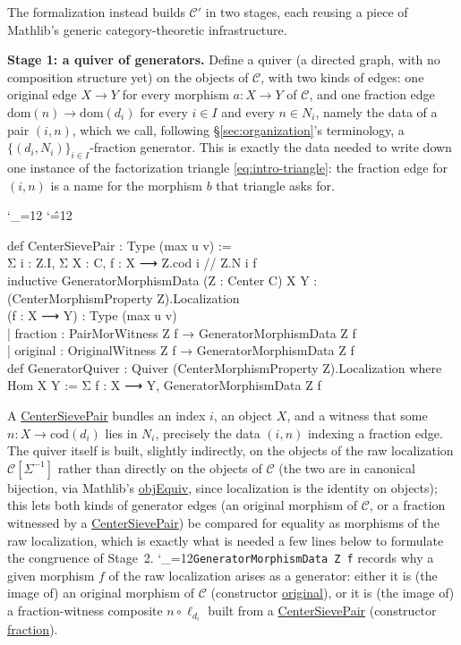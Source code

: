 \documentclass[11pt]{amsart}
\newcommand{\lc}[1]{\url{#1}}
\newcommand{\lcode}{\begingroup\catcode`\_=12\relax\lcodeInner}
\newcommand{\lcodeInner}[1]{\texttt{#1}\endgroup}
\newenvironment{leancode}{%
  \begingroup
  \catcode`\_=12\relax
  \catcode`\^=12\relax
  \small\ttfamily\raggedright\baselineskip=1.15\baselineskip
  \par\smallskip\noindent
}{%
  \par\smallskip
  \endgroup
}
\theoremstyle{plain}
\theoremstyle{definition}
\theoremstyle{remark}
\newcommand{\calC}{\mathcal C}
\newcommand{\dom}{\mathrm{dom}}
\newcommand{\cod}{\mathrm{cod}}
\begin{document}
The formalization instead builds $\calC'$ in two stages, each reusing a piece of Mathlib's
generic category-theoretic infrastructure.

\textbf{Stage 1: a quiver of generators.}
\label{def:pair-fraction}
Define a quiver (a directed graph, with no
composition structure yet) on the objects of $\calC$, with two kinds of edges: one
original edge $X \to Y$ for every morphism $a : X \to Y$ of $\calC$, and one
fraction edge $\dom(n) \to \dom(d_i)$ for every $i \in I$ and every $n \in N_i$, namely the
data of a pair $(i,n)$, which we call, following \S\ref{sec:organization}'s terminology, a
$\{(d_i,N_i)\}_{i\in I}$-fraction generator. This
is exactly the data needed to write down one instance of the factorization triangle
\eqref{eq:intro-triangle}: the fraction edge for $(i,n)$ is a name for the morphism $b$ that
triangle asks for.

\begin{leancode}
def CenterSievePair : Type (max u v) := \\
  Σ i : Z.I, Σ X : C, { f : X ⟶ Z.cod i // Z.N i f } \\[0.5\baselineskip]
inductive GeneratorMorphismData (Z : Center C) {X Y : (CenterMorphismProperty Z).Localization} \\
    (f : X ⟶ Y) : Type (max u v) \\
  | fraction : PairMorWitness Z f → GeneratorMorphismData Z f \\
  | original : OriginalWitness Z f → GeneratorMorphismData Z f \\[0.5\baselineskip]
def GeneratorQuiver : Quiver (CenterMorphismProperty Z).Localization where \\
  Hom X Y := Σ f : X ⟶ Y, GeneratorMorphismData Z f \\
\end{leancode}
A \lc{CenterSievePair} bundles an index $i$, an object $X$, and a witness that some
$n : X \to \cod(d_i)$ lies in $N_i$, precisely the data $(i,n)$ indexing a fraction edge.
The quiver itself is built, slightly indirectly, on the objects of the raw
localization $\calC[\Sigma^{-1}]$ rather than directly on the objects of $\calC$ (the two
are in canonical bijection, via Mathlib's \lc{objEquiv}, since localization is the identity
on objects); this lets both kinds of generator edges (an original morphism of $\calC$, or
a fraction witnessed by a \lc{CenterSievePair}) be compared for equality as
morphisms of the raw localization, which is exactly what is needed a few lines below to
formulate the congruence of Stage~2. \lcode{GeneratorMorphismData Z f} records why a
given morphism $f$ of the raw localization arises as a generator: either it is (the image
of) an original morphism of $\calC$ (constructor \lc{original}), or it is (the image of) a
fraction-witness composite $n \circ \ell_{d_i}$ built from a \lc{CenterSievePair}
(constructor \lc{fraction}).
\end{document}
